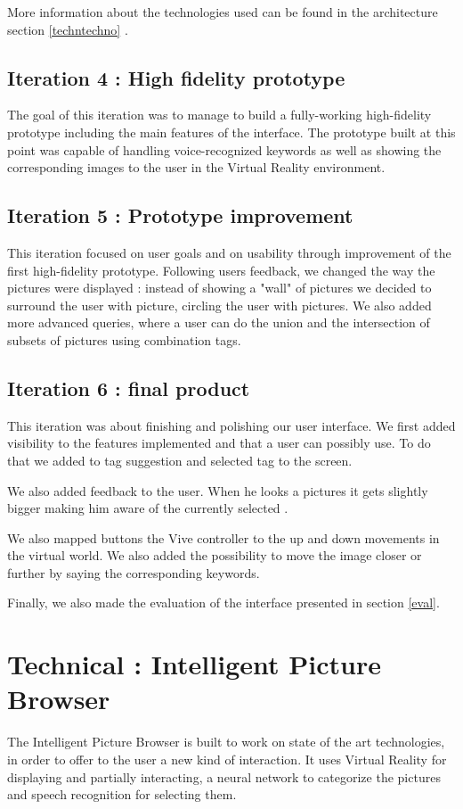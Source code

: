 \documentclass[11pt,a4paper]{article}
\begin{document}
More information about the technologies used can be found in the architecture section \ref{techntechno} .

\subsection{Iteration 4 : High fidelity prototype}

The goal of this iteration was to manage to build a fully-working high-fidelity prototype including the main features of the interface.
The prototype built at this point was capable of handling voice-recognized keywords as well as showing the corresponding images to the user in the Virtual Reality environment.

\subsection{Iteration 5 : Prototype improvement}

This iteration focused on user goals and on usability through improvement of the first high-fidelity prototype. Following users feedback, we changed the way the pictures were displayed : instead of showing a "wall" of pictures we decided to surround the user with picture, circling the user with pictures.
We also added more advanced queries, where a user can do the union and the intersection of subsets of pictures using combination tags.

\subsection{Iteration 6 : final product}

This iteration was about finishing and polishing our user interface. We first added visibility to the features implemented and that a user can possibly use. To do that we added to tag suggestion and selected tag to the screen.

We also added feedback to the user. When he looks a pictures it gets slightly bigger making him aware of the currently selected .

We also mapped buttons the Vive controller to the up and down movements in the virtual world. We also added the possibility to move the image closer or further by saying the corresponding keywords. 

Finally, we also made the evaluation of the interface presented in section \ref{eval}.

\section{Technical : Intelligent Picture Browser}
The Intelligent Picture Browser is built to work on state of the art technologies, in order to offer to the user a new kind of interaction.
It uses Virtual Reality for displaying and partially interacting, a neural network to categorize the pictures and speech recognition for selecting them.
\end{document}

